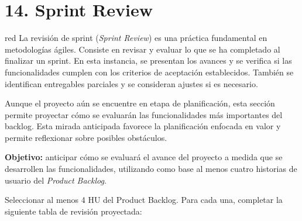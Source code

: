 \section{14. Sprint Review}
\label{sec:sprint_review}


\begin{consigna}{red}
La revisión de sprint (\emph{Sprint Review}) es una práctica fundamental en metodologías ágiles. Consiste en revisar y evaluar lo que se ha completado al finalizar un sprint. En esta instancia, se presentan los avances y se verifica si las funcionalidades cumplen con los criterios de aceptación establecidos. También se identifican entregables parciales y se consideran ajustes si es necesario.

Aunque el proyecto aún se encuentre en etapa de planificación, esta sección permite proyectar cómo se evaluarán las funcionalidades más importantes del backlog. Esta mirada anticipada favorece la planificación enfocada en valor y permite reflexionar sobre posibles obstáculos.

\textbf{Objetivo:} anticipar cómo se evaluará el avance del proyecto a medida que se desarrollen las funcionalidades, utilizando como base al menos cuatro historias de usuario del \emph{Product Backlog}.


Seleccionar al menos 4 HU del Product Backlog. Para cada una, completar la siguiente tabla de revisión proyectada:


\end{consigna}
